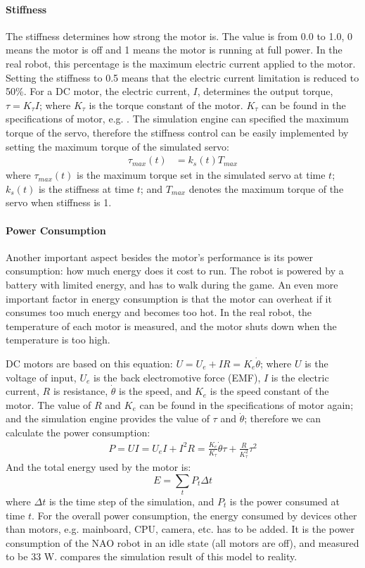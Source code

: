 \documentclass{llncs}
\begin{document}
\paragraph{Stiffness}
The stiffness determines how strong the motor is. The value is from 0.0
to 1.0, 0 means the motor is off and 1 means the motor is running at
full power. In the real robot,
this percentage is the maximum electric current applied to the motor. Setting the
stiffness to 0.5 means that the electric current limitation is reduced
to 50\%.
For a DC motor, the electric current, $I$, determines the output torque,
$\tau = K_\tau I \label{eq:tau-i}$;
where $K_\tau$ is the torque constant of the motor. $K_\tau$ can be found in the
specifications of motor, e.g. \cite{naoqi}.
The simulation engine can specified the maximum torque of the servo, therefore the
stiffness control can be easily implemented by setting the maximum torque
of the simulated servo:
\begin{align}
  \tau_{max}(t) &= k_{s}(t) T_{max}
\end{align}
where $\tau_{max}(t)$ is the maximum torque set in the simulated servo at
time $t$; $k_{s}(t)$ is the stiffness at time $t$; and $T_{max}$
denotes the maximum torque of the servo when stiffness is 1.

\paragraph{Power Consumption}
Another important aspect besides the motor's performance is its
power consumption: how much energy does it cost to run.
The robot is powered by a battery with limited energy, and has to walk during the
game.
An even more important factor in energy consumption is
that the motor can overheat if it consumes too much energy and
becomes too hot.
In the real robot, the temperature of each motor is measured, and the motor shuts down 
when the temperature is too high.

DC motors are based on this equation:
$U = U_e + IR \label{eq:u-ir} = K_e \dot{\theta} \label{eq:u-ke}$;
where $U$ is the voltage of input, $U_e$ is the back electromotive
force (EMF), $I$ is the electric current, $R$ is resistance,
$\dot{\theta}$ is the speed, and $K_e$ is the speed constant of the motor.
The value of $R$ and $K_e$ can be found in the specifications of motor again;
and the simulation engine provides
the value of $\tau$ and $\dot{\theta}$; therefore we can calculate the
power consumption:
\begin{align}
  P = UI = U_eI + I^2R = \frac{K_e}{K_\tau}\dot{\theta}\tau + \frac{R}{K_\tau^2}\tau^2
\end{align}
And the total energy used by the motor is:
\begin{equation}
  \label{eq:motor-power}
  E = \sum_t{P_t\Delta{}t}
\end{equation}
where $\Delta{}t$ is the time step of the simulation, and $P_t$ is the power consumed at time $t$. For the overall
power consumption, the energy consumed by devices other than motors,
e.g. mainboard, CPU, camera, etc. has to be added. It is the power
consumption of the NAO robot in an idle state (all motors are off), and measured to be 33 W.
 compares the simulation result of this model to
reality. 
\end{document}
